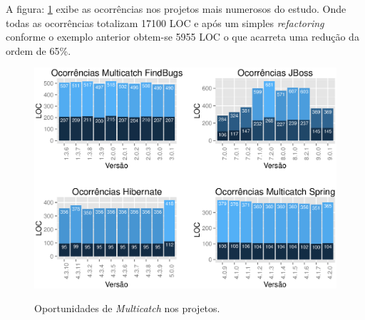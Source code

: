 A figura: \ref{fig:ocorrenciasMulticatchVersoes} exibe as ocorrências nos projetos mais numerosos do estudo. Onde todas as ocorrências totalizam 17100 \acs{LOC} e após um simples \textit{refactoring} conforme o exemplo anterior obtem-se 5955 \acs{LOC} o que acarreta uma redução da ordem de 65\%.\\

\begin{figure}[h]
	\center
	\includegraphics[scale=0.8]{Imagens/ocorrenciasMulticatchVersoes}
	\label{fig:ocorrenciasMulticatchVersoes}
	\caption{Oportunidades de \textit{Multicatch} nos projetos.}
\end{figure}
\clearpage
